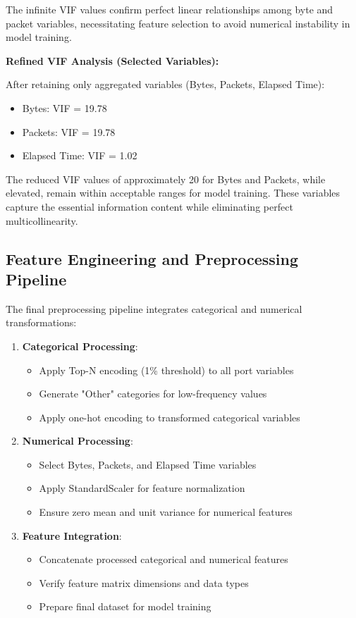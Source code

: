 \documentclass[12pt,a4paper]{article}
\begin{document}
The infinite VIF values confirm perfect linear relationships among byte and packet variables, necessitating feature selection to avoid numerical instability in model training.

\textbf{Refined VIF Analysis (Selected Variables):}

After retaining only aggregated variables (Bytes, Packets, Elapsed Time):
\begin{itemize}
    \item Bytes: VIF = 19.78
    \item Packets: VIF = 19.78
    \item Elapsed Time: VIF = 1.02
\end{itemize}

The reduced VIF values of approximately 20 for Bytes and Packets, while elevated, remain within acceptable ranges for model training. These variables capture the essential information content while eliminating perfect multicollinearity.

\subsection{Feature Engineering and Preprocessing Pipeline}

The final preprocessing pipeline integrates categorical and numerical transformations:

\begin{enumerate}
    \item \textbf{Categorical Processing}:
    \begin{itemize}
        \item Apply Top-N encoding (1\% threshold) to all port variables
        \item Generate "Other" categories for low-frequency values
        \item Apply one-hot encoding to transformed categorical variables
    \end{itemize}
    
    \item \textbf{Numerical Processing}:
    \begin{itemize}
        \item Select Bytes, Packets, and Elapsed Time variables
        \item Apply StandardScaler for feature normalization
        \item Ensure zero mean and unit variance for numerical features
    \end{itemize}
    
    \item \textbf{Feature Integration}:
    \begin{itemize}
        \item Concatenate processed categorical and numerical features
        \item Verify feature matrix dimensions and data types
        \item Prepare final dataset for model training
    \end{itemize}
\end{enumerate}
\end{document}
